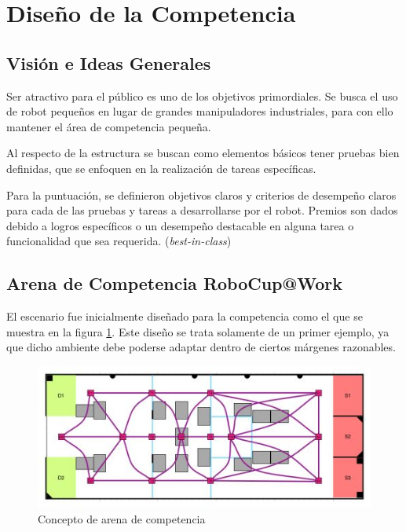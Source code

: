 \documentclass[12pt]{article}
\begin{document}
\section{Diseño de la Competencia}

\subsection{Visión e Ideas Generales}

Ser atractivo para el público es uno de los objetivos primordiales. Se busca el uso de robot pequeños en lugar de grandes manipuladores industriales, para con ello mantener el área de competencia pequeña.

Al respecto de la estructura se buscan como elementos básicos tener pruebas bien definidas, que se enfoquen en la realización de tareas específicas.

Para la puntuación, se definieron objetivos claros y criterios de desempeño claros para cada de las pruebas y tareas a desarrollarse por el robot. Premios son dados debido a logros específicos o un desempeño destacable en alguna tarea o funcionalidad que sea requerida. (\emph{best-in-class})

\subsection{Arena de Competencia RoboCup@Work}

El escenario fue inicialmente diseñado para la competencia como el que se muestra en la figura \ref{fig:arena_concept}. Este diseño se trata solamente de un primer ejemplo, ya que dicho ambiente debe poderse adaptar dentro de ciertos márgenes razonables.

\begin{figure} [h!]
	\centering
	\includegraphics[scale=1]{images/arena_first_concept.JPG}
	\caption{Concepto de arena de competencia}
	\label{fig:arena_concept}
\end{figure}
\end{document}
